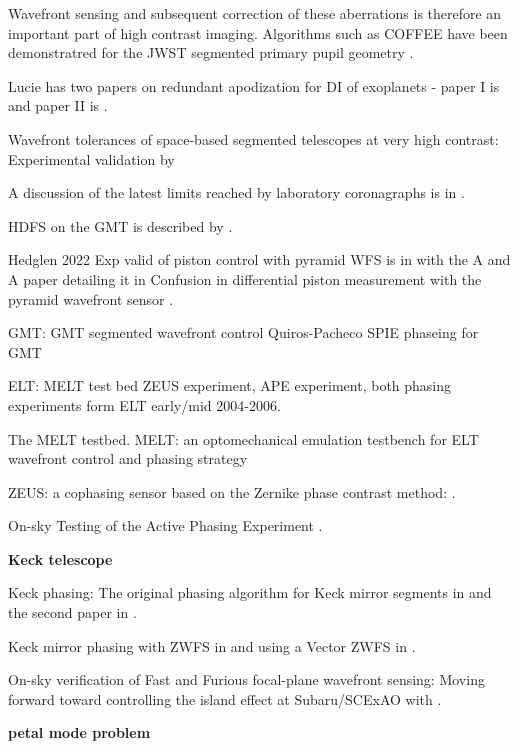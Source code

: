 \documentclass[letterpaper]{ar-1col}
\begin{document}
Wavefront sensing and subsequent correction of these aberrations is therefore an important part of high contrast imaging.
%
Algorithms such as COFFEE have been demonstratred for the JWST segmented primary pupil geometry \citep{Leboulleux20}.

Lucie has two papers on redundant apodization for DI of exoplanets - paper I is \citep{Leboulleux22} and paper II is \citet{Leboulleux22a}.

Wavefront tolerances of space-based segmented telescopes at very high contrast: Experimental validation by \citet{Laginja22}

A discussion of the latest limits reached by laboratory coronagraphs is in \citet{Mennesson24}.



HDFS on the GMT is described by \citet{Haffert22}.

Hedglen 2022 Exp valid of piston control with pyramid WFS is in \citet{Bertrou-Cantou23} with the A and A paper detailing it in Confusion in differential piston measurement with the pyramid wavefront sensor \citep{Bertrou-Cantou22}.

GMT: GMT segmented wavefront control Quiros-Pacheco SPIE phaseing for GMT \citep{Quiros-Pacheco22}


ELT: MELT test bed ZEUS experiment, APE experiment, both phasing experiments form ELT early/mid 2004-2006.

The MELT testbed. MELT: an optomechanical emulation testbench for ELT wavefront control and phasing strategy \citep{Pfrommer18}

ZEUS: a cophasing sensor based on the Zernike phase contrast method: \citep{Dohlen06}.

On-sky Testing of the Active Phasing Experiment  \citet{Gonte09}.

{\bf Keck telescope}

Keck phasing: The original phasing algorithm for Keck mirror segments in \citet{Chanan98} and the second paper in \citet{Chanan00}.

Keck mirror phasing with ZWFS in \citet{vanKooten22} and using a Vector ZWFS in \citet{Salama24}.

On-sky verification of Fast and Furious focal-plane wavefront sensing: Moving forward toward controlling the island effect at Subaru/SCExAO with \citet{Bos20}.

{\bf petal mode problem}
\end{document}
